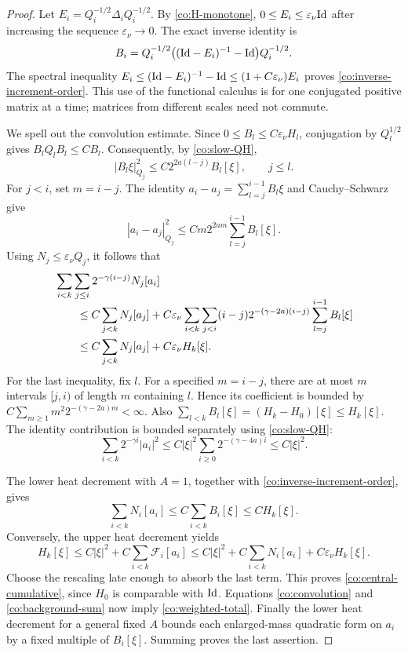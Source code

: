 \begin{proof}
Let \(E_i=Q_i^{-1/2}\Delta_iQ_i^{-1/2}\).
By \eqref{co:H-monotone}, \(0\le E_i\le\varepsilon_\nu\mathrm{Id}\)
after increasing the sequence \(\varepsilon_\nu\to0\).
The exact inverse identity is
\[
 B_i=Q_i^{-1/2}\bigl((\mathrm{Id}-E_i)^{-1}-\mathrm{Id}\bigr)Q_i^{-1/2}.
\]
The spectral inequality
\(E_i\le(\mathrm{Id}-E_i)^{-1}-\mathrm{Id}\le(1+C\varepsilon_\nu)E_i\)
proves \eqref{co:inverse-increment-order}.  This use of the
functional calculus is for one conjugated positive matrix at a
time; matrices from different scales need not commute.

We spell out the convolution estimate.  Since
\(0\le B_l\le C\varepsilon_\nu H_l\), conjugation by
\(Q_l^{1/2}\) gives \(B_lQ_lB_l\le C B_l\).  Consequently, by
\eqref{co:slow-QH},
\begin{equation}\label{co:B-vector-bound}
 |B_l\xi|_{Q_j}^2\le C2^{2a(l-j)}B_l[\xi],\qquad j\le l.
\end{equation}
For \(j<i\), set \(m=i-j\).  The identity
\(a_i-a_j=\sum_{l=j}^{i-1}B_l\xi\) and Cauchy--Schwarz give
\[
 |a_i-a_j|_{Q_j}^2
 \le C m2^{2am}\sum_{l=j}^{i-1}B_l[\xi].
\]
Using \(N_j\le\varepsilon_\nu Q_j\), it follows that
\begin{align}
 &\sum_{i<k}\sum_{j\le i}2^{-\gamma(i-j)}N_j[a_i]
       \label{co:convolution}\\[-2mm]
 &\qquad\le C\sum_{j<k}N_j[a_j]
       +C\varepsilon_\nu
          \sum_{i<k}\sum_{j<i}(i-j)2^{-(\gamma-2a)(i-j)}
                    \sum_{l=j}^{i-1}B_l[\xi]\notag\\
 &\qquad\le C\sum_{j<k}N_j[a_j]
             +C\varepsilon_\nu H_k[\xi].\notag
\end{align}
For the last inequality, fix \(l\).  For a specified \(m=i-j\),
there are at most \(m\) intervals \([j,i)\) of length \(m\)
containing \(l\).  Hence its coefficient is bounded by
\(C\sum_{m\ge1}m^2 2^{-(\gamma-2a)m}<\infty\).
Also \(\sum_{l<k}B_l[\xi]=(H_k-H_0)[\xi]\le H_k[\xi]\).
The identity contribution is bounded separately using
\eqref{co:slow-QH}:
\begin{equation}\label{co:background-sum}
 \sum_{i<k}2^{-\gamma i}|a_i|^2
 \le C|\xi|^2\sum_{i\ge0}2^{-(\gamma-4a)i}
 \le C|\xi|^2.
\end{equation}

The lower heat decrement with \(A=1\), together with
\eqref{co:inverse-increment-order}, gives
\[
 \sum_{i<k}N_i[a_i]\le C\sum_{i<k}B_i[\xi]
 \le C H_k[\xi].
\]
Conversely, the upper heat decrement yields
\[
 H_k[\xi]\le C|\xi|^2+C\sum_{i<k}\mathcal F_i[a_i]
 \le C|\xi|^2+C\sum_{i<k}N_i[a_i]
                         +C\varepsilon_\nu H_k[\xi].
\]
Choose the rescaling late enough to absorb the last term.  This
proves \eqref{co:central-cumulative}, since \(H_0\) is comparable
with \(\mathrm{Id}\).  Equations \eqref{co:convolution} and
\eqref{co:background-sum} now imply
\eqref{co:weighted-total}.  Finally the lower heat decrement for
a general fixed \(A\) bounds each enlarged-mass quadratic form
on \(a_i\) by a fixed multiple of \(B_i[\xi]\).  Summing proves
the last assertion.
\end{proof}

